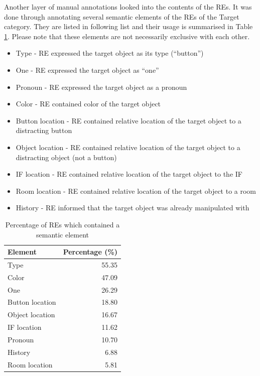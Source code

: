 Another layer of manual annotations looked into the contents of the REs. It was done through annotating several semantic elements of the REs of the Target category. They are listed in following list and their usage is summarised in Table \ref{tab:res-contents}. Please note that these elements are not necessarily exclusive with each other.

\begin{itemize}
\item
Type - RE expressed the target object as its type (``button'')
\item
One - RE expressed the target object as ``one''
\item
Pronoun - RE expressed the target object as a pronoun
\item
Color -  RE contained color of the target object
\item
Button location - RE contained relative location of the target object to a distracting button
\item
Object location - RE contained relative location of the target object to a distracting object (not a button)
\item 
IF location - RE contained relative location of the target object to the IF
\item
Room location - RE contained relative location of the target object to a room
\item
History - RE informed that the target object was already manipulated with
\end{itemize}

\begin{table}[h!]
\centering
\begin{tabular}{lr}
\toprule
Element  & Percentage (\%)  \\
\midrule
Type   			& 55.35\\
Color			& 47.09\\
One 				& 26.29\\
Button location & 18.80\\
Object location 	& 16.67\\
IF location		& 11.62\\
Pronoun			& 10.70\\
History			& 6.88\\
Room location 	& 5.81\\
\bottomrule
\end{tabular}
\caption{Percentage of REs which contained a semantic element}
\label{tab:res-contents}
\end{table} 

